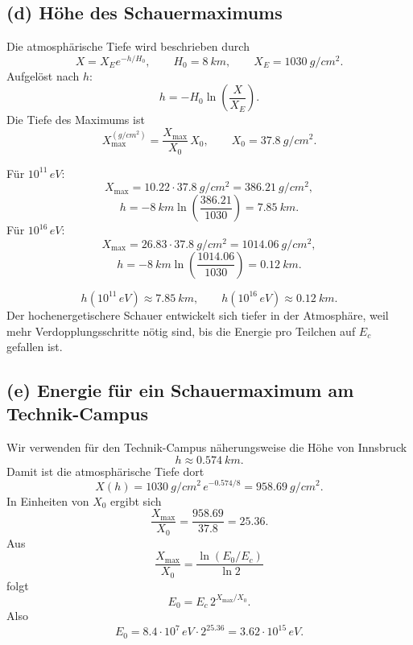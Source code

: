 \documentclass[11pt,a4paper]{scrartcl}
\newcommand{\paren}[1]{\left( #1 \right)}
\theoremstyle{definition}
\theoremstyle{plain}
\theoremstyle{remark}
\begin{document}
\subsection*{(d) H\"ohe des Schauermaximums}

\begin{calculationbox}
Die atmosph\"arische Tiefe wird beschrieben durch
\[
    X=X_E e^{-h/H_0},
    \qquad
    H_0=\SI{8}{km},
    \qquad
    X_E=\SI{1030}{g/cm^2}.
\]
Aufgel\"ost nach $h$:
\[
    h=-H_0\ln\paren{\frac{X}{X_E}}.
\]
Die Tiefe des Maximums ist
\[
    X_{\max}^{(\si{g/cm^2})}=\frac{X_{\max}}{X_0}\,X_0,
    \qquad X_0=\SI{37.8}{g/cm^2}.
\]
\end{calculationbox}

\begin{calculationbox}[title=Numerik]
F\"ur $10^{11}\,\si{eV}$:
\[
    X_{\max}=10.22\cdot \SI{37.8}{g/cm^2}=\SI{386.21}{g/cm^2},
\]
\[
    h=-\SI{8}{km}\ln\paren{\frac{386.21}{1030}}=\SI{7.85}{km}.
\]
F\"ur $10^{16}\,\si{eV}$:
\[
    X_{\max}=26.83\cdot \SI{37.8}{g/cm^2}=\SI{1014.06}{g/cm^2},
\]
\[
    h=-\SI{8}{km}\ln\paren{\frac{1014.06}{1030}}=\SI{0.12}{km}.
\]
\end{calculationbox}

\begin{answerbox}
\[
    \boxed{h(10^{11}\,\si{eV})\approx \SI{7.85}{km}},
    \qquad
    \boxed{h(10^{16}\,\si{eV})\approx \SI{0.12}{km}}.
\]
Der hochenergetischere Schauer entwickelt sich tiefer in der Atmosph\"are, weil mehr Verdopplungsschritte n\"otig sind, bis die Energie pro Teilchen auf $E_c$ gefallen ist.
\end{answerbox}

\subsection*{(e) Energie f\"ur ein Schauermaximum am Technik-Campus}

\begin{calculationbox}
Wir verwenden f\"ur den Technik-Campus n\"aherungsweise die H\"ohe von Innsbruck
\[
    h\approx \SI{0.574}{km}.
\]
Damit ist die atmosph\"arische Tiefe dort
\[
    X(h)=\SI{1030}{g/cm^2}\,e^{-0.574/8}=\SI{958.69}{g/cm^2}.
\]
In Einheiten von $X_0$ ergibt sich
\[
    \frac{X_{\max}}{X_0}=\frac{958.69}{37.8}=25.36.
\]
Aus
\[
    \frac{X_{\max}}{X_0}=\frac{\ln(E_0/E_c)}{\ln 2}
\]
folgt
\[
    E_0=E_c\,2^{X_{\max}/X_0}.
\]
Also
\[
    E_0=8.4\cdot 10^7\,\si{eV}\cdot 2^{25.36}
    =3.62\cdot 10^{15}\,\si{eV}.
\]
\end{calculationbox}
\end{document}
